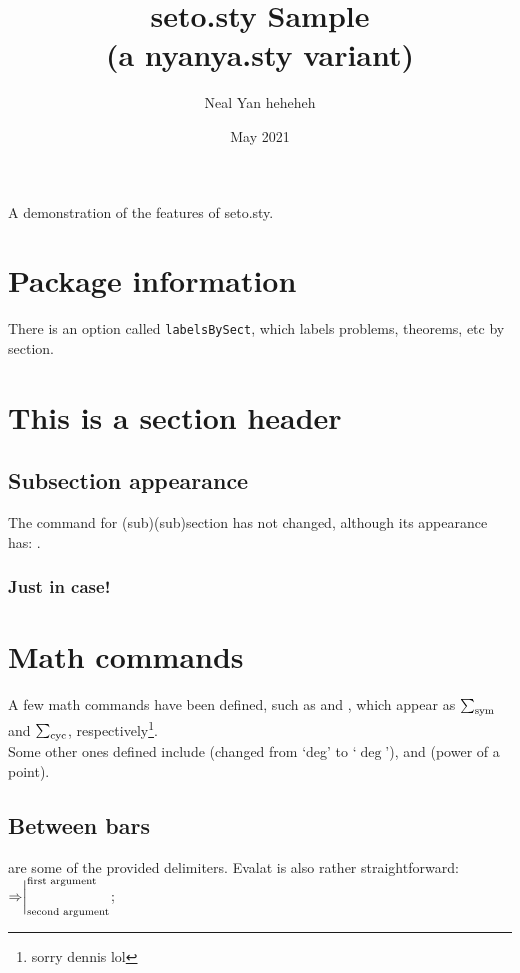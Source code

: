 \documentclass{article}
\title{seto.sty Sample\\(a nyanya.sty variant)}
\author{Neal Yan heheheh}
\date{May 2021}
\begin{document}
\maketitle
A demonstration of the features of seto.sty.
\section*{Package information}
There is an option called \texttt{labelsBySect}, which labels problems, theorems, etc by section.
\toc

\section{This is a section header}
\subsection{Subsection appearance}

The command for (sub)(sub)section has not changed, although its appearance has: .

\subsubsection{Just in case!}
\section{Math commands}

A few math commands have been defined, such as  and , which appear as $\symsum$ and $\cycsum$, respectively\footnote{sorry dennis lol}.\\
Some other ones defined include (changed from `deg' to `$\deg$'), and (power of a point).

\subsection{Between bars}
 are some of the provided delimiters. Evalat is also rather straightforward:\\
$\Rightarrow\evalat[\text{first argument}]{\text{second argument}}$;
\end{document}
